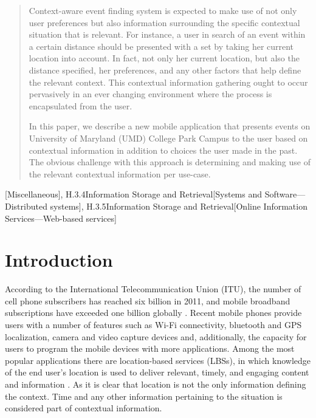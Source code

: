 \documentclass{acm_proc_article-sp}
\begin{document}
\date{9 May 2013}


\maketitle
\begin{abstract}
Context-aware event finding system is expected to make use of not only user preferences but also information surrounding the specific contextual situation that is relevant. For instance, a user in search of an event within a certain distance should be presented with a set by taking her current location into account. In fact, not only her current location, but also the distance specified, her preferences, and any other factors that help define the relevant context. This contextual information gathering ought to occur pervasively in an ever changing environment where the process is encapsulated from the user.

In this paper, we describe a new mobile application that presents events on University of Maryland (UMD) College Park Campus to the user based on contextual information in addition to choices the user made in the past. The obvious challenge with this approach is determining and making use of the relevant contextual information per use-case.
\end{abstract}

[Miscellaneous], {H.3.4}{Information Storage and Retrieval}[Systems and Software—Distributed systems], {H.3.5}{Information Storage and Retrieval}[Online Information Services—Web-based services]


\section{Introduction}
According to the International Telecommunication Union (ITU), the number of cell phone subscribers has reached six billion in 2011, and mobile broadband subscriptions have exceeded one billion globally \cite{itu:cellphone}. Recent mobile phones provide users with a number of features such as Wi-Fi connectivity, bluetooth and GPS localization, camera and video capture devices and, additionally, the capacity for users to program the mobile devices with more applications. Among the most popular applications there are location-based services (LBSs), in which knowledge of the end user’s location is used to deliver relevant, timely, and engaging content and information \cite{rao:lbs}. As it is clear that location is not the only information defining the context. Time and any other information pertaining to the situation is considered part of contextual information. 
\end{document}
